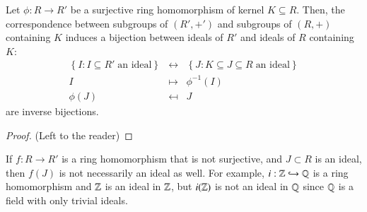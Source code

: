 \begin{namthm}\label{thmname:corrring}
    Let $\phi:R \rightarrow R'$ be a surjective ring homomorphism of kernel $K \subseteq R$. Then, the correspondence between subgroups of $(R',+')$ and subgroups of $(R,+)$ containing $K$ induces a bijection between ideals of $R'$ and ideals of $R$ containing $K$: 
    \begin{equation}
        \begin{array}{rcl}
            \left\{I:I\subseteq R'\;\text{an ideal}\right\} &\leftrightarrow& \left\{J:K \subseteq J \subseteq R\;\text{an ideal}\right\} \\
            I &\mapsto& \phi^{-1}(I) \\
            \phi(J) &\mapsfrom& J
        \end{array}
    \end{equation}
    are inverse bijections.
\end{namthm}
\begin{proof}
    (Left to the reader)
\end{proof}

\begin{rmk}
        If $f:R\rightarrow R'$ is a ring homomorphism that is not surjective, and $J \subset R$ is an ideal, then $f(J)$ is not necessarily an ideal as well. For example, $i:\mathbb Z\hookrightarrow \mathbb Q$ is a ring homomorphism and $\mathbb Z$ is an ideal in $\mathbb Z$, but $i(\mathbb Z)$ is not an ideal in $\mathbb Q$ since $\mathbb Q$ is a field with only trivial ideals.
\end{rmk}